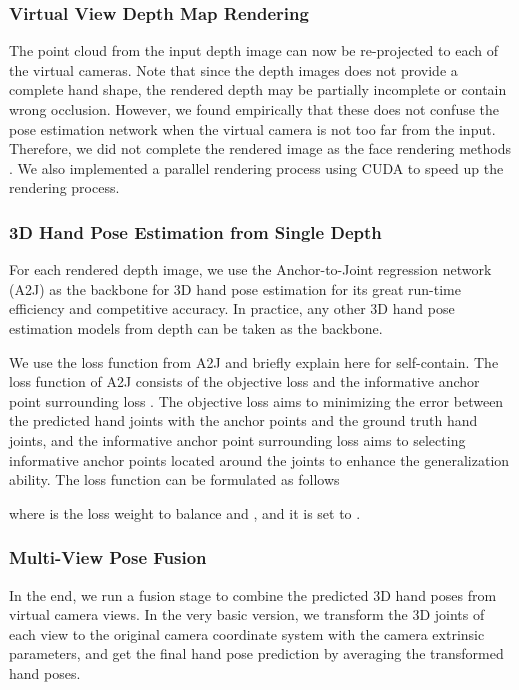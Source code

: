 \documentclass[letterpaper]{article} \usepackage{aaai22}  \usepackage{times}  \usepackage{helvet}  \usepackage{courier}  \usepackage[hyphens]{url}  \usepackage{graphicx} \urlstyle{rm} \def\UrlFont{\rm}  \usepackage{natbib}  \usepackage{caption} \DeclareCaptionStyle{ruled}{labelfont=normalfont,labelsep=colon,strut=off} \frenchspacing  \setlength{\pdfpagewidth}{8.5in}  \setlength{\pdfpageheight}{11in}  \usepackage{algorithm}
\begin{document}
\subsubsection{Virtual View Depth Map Rendering}
The point cloud from the input depth image can now be re-projected to each of the virtual cameras.
Note that since the depth images does not provide a complete hand shape, the rendered depth may be partially incomplete or contain wrong occlusion.
However, we found empirically that these does not confuse the pose estimation network when the virtual camera is not too far from the input. Therefore, we did not complete the rendered image as the face rendering methods \cite{zhou2020rotate, fu2021high}.
We also implemented a parallel rendering process using CUDA to speed up the rendering process. 

\subsubsection{3D Hand Pose Estimation from Single Depth}
For each rendered depth image, we use the Anchor-to-Joint regression network (A2J) \cite{xiong2019a2j} as the backbone for 3D hand pose estimation for its great run-time efficiency and competitive accuracy.
In practice, any other 3D hand pose estimation models from depth can be taken as the backbone. 

We use the loss function from A2J and briefly explain here for self-contain. The loss function  of A2J consists of the objective loss  and the informative anchor point surrounding loss . The objective loss  aims to minimizing the error between the predicted hand joints with the anchor points and the ground truth hand joints, and the informative anchor point surrounding loss  aims to selecting informative anchor points located around the joints to enhance the generalization ability. The loss function  can be formulated as follows

where  is the loss weight to balance  and , and it is set to .

\subsubsection{Multi-View Pose Fusion}
In the end, we run a fusion stage to combine the predicted 3D hand poses from virtual camera views.
In the very basic version, 
we transform the 3D joints of each view to the original camera coordinate system with the camera extrinsic parameters, and get the final hand pose prediction by averaging the transformed hand poses.
\end{document}
